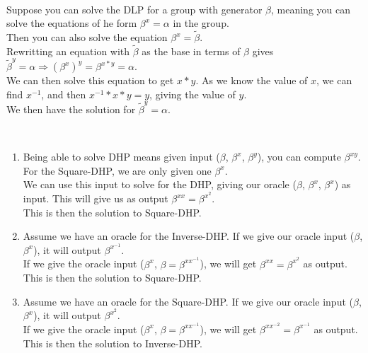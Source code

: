 \documentclass{assignment}
\begin{document}
\begin{problemlist}
\pbitem
\begin{problem}
\end{problem}
\begin{answer}
  \\
  Suppose you can solve the DLP for a group with generator $\beta$, meaning you can solve the equations of he form $\beta^x = \alpha$ in the group.\\
  Then you can also solve the equation $\beta^x = \widetilde{\beta}$.\\
  Rewritting an equation with $\widetilde{\beta}$ as the base in terms of $\beta$ gives $\widetilde{\beta}^y=\alpha \Rightarrow (\beta^{x})^y=\beta^{x*y}=\alpha$.\\
  We can then solve this equation to get $x*y$.
  As we know the value of $x$, we can find $x^{-1}$, and then $x^{-1}*x*y = y$, giving the value of $y$.\\
  We then have the solution for $\widetilde{\beta}^y=\alpha$.\\
\end{answer}

\pbitem
\begin{problem}
\end{problem}
\begin{answer}
  \\
  \begin{enumerate}
  \item
    Being able to solve DHP means given input ($\beta$, $\beta^x$, $\beta^y$), you can compute $\beta^{xy}$.\\
    For the Square-DHP, we are only given one $\beta^x$.\\
    We can use this input to solve for the DHP, giving our oracle ($\beta$, $\beta^x$, $\beta^x$) as input. This will give us as output $\beta^{xx}=\beta^{x^2}$.\\
    This is then the solution to Square-DHP.\\
  \item
    Assume we have an oracle for the Inverse-DHP. If we give our oracle input ($\beta$, $\beta^x$), it will output $\beta^{x^{-1}}$.\\
    If we give the oracle input ($\beta^x$, $\beta=\beta^{xx^{-1}}$), we will get $\beta^{xx}=\beta^{x^2}$ as output.\\
    This is then the solution to Square-DHP.\\
  \item
    Assume we have an oracle for the Square-DHP. If we give our oracle input ($\beta$, $\beta^x$), it will output $\beta^{x^2}$.\\
    If we give the oracle input ($\beta^x$, $\beta=\beta^{xx^{-1}}$), we will get $\beta^{xx^{-2}}=\beta^{x^{-1}}$ as output.\\
    This is then the solution to Inverse-DHP.\\
  \end{enumerate}
\end{answer}

\end{problemlist}
\end{document}
